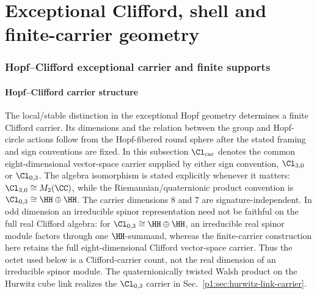 \documentclass[11pt]{article}
\begin{document}
\clearpage

\part{Exceptional Clifford, shell and finite-carrier geometry}
\section{Hopf--Clifford exceptional carrier and finite supports}
\subsection{Hopf--Clifford carrier structure}
\label{p1:subsec:hopf-clifford-carrier}

The local/stable distinction in the exceptional Hopf geometry determines a finite Clifford carrier.
Its dimensions and the relation between the group and Hopf-circle actions follow
from the Hopf-fibered round sphere after the stated framing and sign conventions
are fixed.
In this subsection \(\Cl_{\mathrm{car}}\) denotes the common eight-dimensional vector-space carrier supplied by either sign convention, \(\Cl_{3,0}\) or \(\Cl_{0,3}\).  The algebra isomorphism is stated explicitly whenever it matters: \(\Cl_{3,0}\cong M_2(\CC)\), while the Riemannian/quaternionic product convention is \(\Cl_{0,3}\cong\HH\oplus\HH\).  The carrier dimensions \(8\) and \(7\) are signature-independent.  In odd dimension an irreducible spinor representation need not be faithful on the full real Clifford algebra: for \(\Cl_{0,3}\cong\HH\oplus\HH\), an irreducible real spinor module factors through one \(\HH\)-summand, whereas the finite-carrier construction here retains the full eight-dimensional Clifford vector-space carrier.  Thus the octet used below is a Clifford-carrier count, not the real dimension of an irreducible spinor module.  The quaternionically twisted Walsh product on the Hurwitz cube link realizes the \(\Cl_{0,3}\) carrier in Sec.~\ref{p1:sec:hurwitz-link-carrier}.
\end{document}
